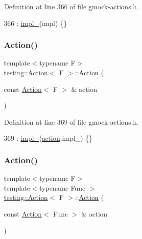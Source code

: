 Definition at line 366 of file gmock-\/actions.\+h.


\begin{DoxyCode}
366 : \hyperlink{classtesting_1_1Action_a878cb86f5126a22b5c6d5d8fb919f5d9}{impl\_}(impl) \{\}
\end{DoxyCode}
\mbox{\label{classtesting_1_1Action_a7027316ea3a6972ce7847496eb360ccd}} 
\subsubsection{\texorpdfstring{Action()}{Action()}\hspace{0.1cm}{\footnotesize\ttfamily [3/5]}}
{\footnotesize\ttfamily template$<$typename F$>$ \\
\hyperlink{classtesting_1_1Action}{testing\+::\+Action}$<$ F $>$\+::\hyperlink{classtesting_1_1Action}{Action} (\begin{DoxyParamCaption}\item[{const \hyperlink{classtesting_1_1Action}{Action}$<$ F $>$ \&}]{action }\end{DoxyParamCaption})\hspace{0.3cm}{\ttfamily [inline]}}



Definition at line 369 of file gmock-\/actions.\+h.


\begin{DoxyCode}
369 : \hyperlink{classtesting_1_1Action_a878cb86f5126a22b5c6d5d8fb919f5d9}{impl\_}(\hyperlink{namespaceupload_a675d13c979f1c720866d22ed1736f580}{action}.impl\_) \{\}
\end{DoxyCode}
\mbox{\label{classtesting_1_1Action_a806bacddaa1f1daf61f89674564bdf0f}} 
\subsubsection{\texorpdfstring{Action()}{Action()}\hspace{0.1cm}{\footnotesize\ttfamily [4/5]}}
{\footnotesize\ttfamily template$<$typename F$>$ \\
template$<$typename Func $>$ \\
\hyperlink{classtesting_1_1Action}{testing\+::\+Action}$<$ F $>$\+::\hyperlink{classtesting_1_1Action}{Action} (\begin{DoxyParamCaption}\item[{const \hyperlink{classtesting_1_1Action}{Action}$<$ Func $>$ \&}]{action }\end{DoxyParamCaption})\hspace{0.3cm}{\ttfamily [explicit]}}

